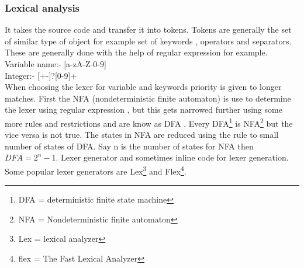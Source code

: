 \documentclass[23pt]{article}
\begin{document}
\subsubsection{Lexical analysis}
{\Large It takes the source code and transfer it into tokens. Tokens are generally the set of similar type of object for example set of keywords , operators and separators. These are generally done with the help of regular expression for example.
Variable name:- [a-zA-Z-0-9] \\
Integer:- [+-]?[0-9]+ \\
When choosing the lexer for variable and keywords priority is given to longer matches. First the NFA (nondeterministic finite automaton) is use to determine the lexer using regular expression
, but this gets narrowed further using some more rules and restrictions and are know
as DFA . Every DFA\footnote{ DFA =  deterministic finite state machine } is NFA\footnote{ NFA = Nondeterministic finite automaton} but the vice versa is not true. The states in NFA are reduced using the rule to small number of states of DFA. Say n is the number of states for NFA then  $ DFA=2^n-1 $.
Lexer generator and sometimes inline code for lexer generation. Some popular lexer generators are Lex\footnote{ Lex = lexical analyzer} and Flex\footnote{flex = The Fast Lexical Analyzer}. \par}
\end{document}
